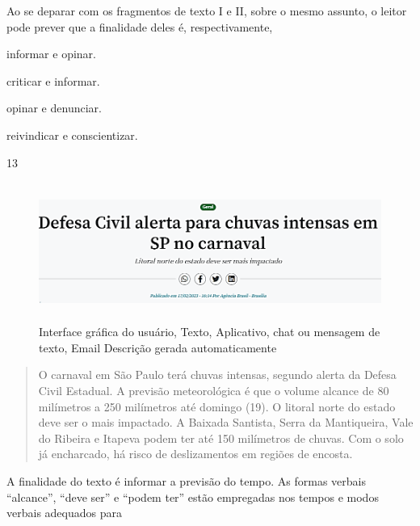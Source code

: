 Ao se deparar com os fragmentos de texto I e II, sobre o mesmo assunto,
o leitor pode prever que a finalidade deles é, respectivamente,

\begin{escolha}
\item informar e opinar.

\item criticar e informar.

\item opinar e denunciar.

\item reivindicar e conscientizar.
\end{escolha}

\num{13}

\begin{figure}
\centering
\includegraphics[width=5.90556in,height=1.78681in]{./imgSAEB_8_POR/media/image4.png}
\caption{Interface gráfica do usuário, Texto, Aplicativo, chat ou
mensagem de texto, Email Descrição gerada automaticamente}
\end{figure}

\begin{quote}
O carnaval em São Paulo terá chuvas intensas, segundo alerta da Defesa
Civil Estadual. A previsão meteorológica é que o volume alcance de 80
milímetros a 250 milímetros até domingo (19). O litoral norte do estado
deve ser o mais impactado. A Baixada Santista, Serra da Mantiqueira,
Vale do Ribeira e Itapeva podem ter até 150 milímetros de chuvas. Com o
solo já encharcado, há risco de deslizamentos em regiões de encosta.
\end{quote}


A finalidade do texto é informar a previsão do tempo. As formas verbais
``alcance'', ``deve ser'' e ``podem ter'' estão empregadas nos tempos e
modos verbais adequados para

